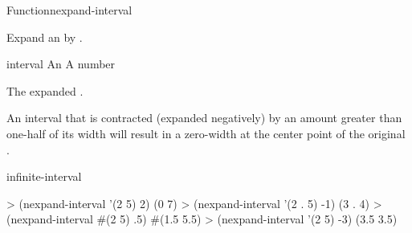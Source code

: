 \documentclass[10pt,twoside,english,pdftex]{article}
\begin{document}
\begin{functiondoc}{Function}{nexpand-interval}%
  {
    \returns{} }
%
%

\fnsyntax

\fnpurpose Expand an  by .

\fnpackage {}

\fnmodule {}

\fnargs
\begin{args}{interval}
\arg[interval] An 
\arg[amount] A number
\end{args}

\fnreturns The expanded .

\fndescription An interval that is contracted (expanded negatively) by an
amount greater than one-half of its width will result in a zero-width
 at the center point of the original .

\begin{alsos}{infinite-interval}
\end{alsos}

\fnexamples
%
\W\supp
\begin{example}
> (nexpand-interval '(2 5) 2)
(0 7)
> (nexpand-interval '(2 . 5) -1)
(3 . 4)\goodpagebreak
> (nexpand-interval #(2 5) .5)
#(1.5 5.5)
> (nexpand-interval '(2 5) -3)
(3.5 3.5)
\end{example}

\end{functiondoc}

\end{document}
